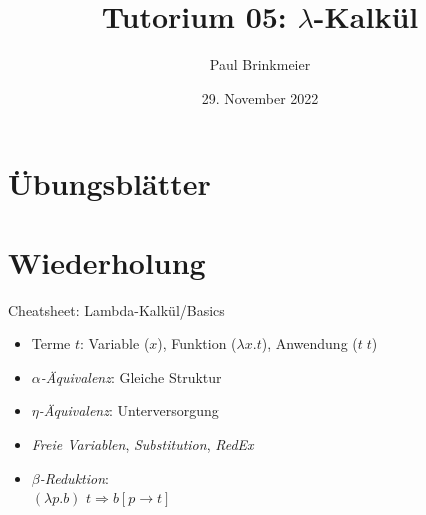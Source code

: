 \documentclass{beamer}
\title{Tutorium 05: $\lambda$-Kalkül}
\author{Paul Brinkmeier}
\institute{Tutorium Programmierparadigmen am KIT}
\date{29. November 2022}
\begin{document}
\begin{frame}
	\titlepage
\end{frame}

\section{Übungsblätter}

\section{Wiederholung}

\begin{frame}{Cheatsheet: Lambda-Kalkül/Basics}
  \begin{itemize}
    \item Terme $t$: Variable ($x$), Funktion ($\lambda x . t$), Anwendung ($t \; t$)
    \item \emph{$\alpha$-Äquivalenz}: Gleiche Struktur
    \item \emph{$\eta$-Äquivalenz}: Unterversorgung
    \item \emph{Freie Variablen}, \emph{Substitution}, \emph{RedEx}
    \item \emph{$\beta$-Reduktion}: \\
          $(\lambda{}p.b)$ $t \Rightarrow b\left[p\rightarrow{}t\right]$
  \end{itemize}
\end{frame}
\end{document}
